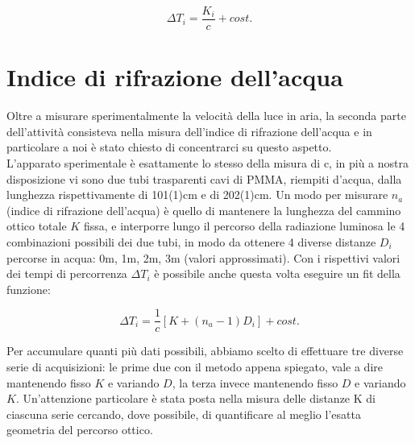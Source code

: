 \documentclass[journal, a4paper]{IEEEtran}
\begin{document}
\begin{equation}
\Delta T_i = \frac{K_i}{c} + cost.
\end{equation}

\section{Indice di rifrazione dell'acqua}
Oltre a misurare sperimentalmente la velocità della luce in aria, la seconda parte dell'attività consisteva nella misura dell'indice di rifrazione dell'acqua e in particolare a noi è stato chiesto di concentrarci su questo aspetto.\\
L'apparato sperimentale è esattamente lo stesso della misura di c, in più a nostra disposizione vi sono due tubi trasparenti cavi di PMMA, riempiti d'acqua, dalla lunghezza rispettivamente di 101(1)cm e di 202(1)cm. Un modo per misurare $n_a$ (indice di rifrazione dell'acqua) è quello di mantenere la lunghezza del cammino ottico totale $K$ fissa, e interporre lungo il percorso della radiazione luminosa le 4 combinazioni possibili dei due tubi, in modo da ottenere 4 diverse distanze $D_i$ percorse in acqua: 0m, 1m, 2m, 3m (valori approssimati). Con i rispettivi valori dei tempi di percorrenza $\Delta T_i$ è possibile anche questa volta eseguire un fit della funzione:

\begin{equation}
\Delta T_i = \frac{1}{c} \left[ K + (n_a - 1) D_i \right] + cost.
\end{equation}

Per accumulare quanti più dati possibili, abbiamo scelto di effettuare tre diverse serie di acquisizioni: le prime due con il metodo appena spiegato, vale a dire mantenendo fisso $K$ e variando $D$, la terza invece mantenendo fisso $D$ e variando $K$. Un'attenzione particolare è stata posta nella misura delle distanze K di ciascuna serie cercando, dove possibile, di quantificare al meglio l'esatta geometria del percorso ottico.\\
\end{document}
